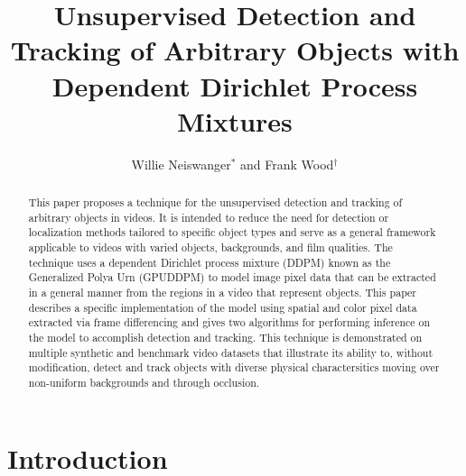 \documentclass[twocolumn, final]{svjour3}
\begin{document}

\title{Unsupervised Detection and Tracking of Arbitrary Objects with Dependent Dirichlet Process Mixtures}
\author{Willie Neiswanger$^{*}$ and Frank Wood$^{\dagger}$}
\date{}  %
\maketitle



\begin{abstract}
This paper proposes a technique for the unsupervised detection and tracking of arbitrary objects in videos. It is intended to reduce the need for detection or localization methods tailored to specific object types and serve as a general framework applicable to videos with varied objects, backgrounds, and film qualities. The technique uses a dependent Dirichlet process mixture (DDPM) known as the Generalized Polya Urn (GPUDDPM) to model image pixel data that can be extracted in a general manner from the regions in a video that represent objects. This paper describes a specific implementation of the model using spatial and color pixel data extracted via frame differencing and gives two algorithms for performing inference on the model to accomplish detection and tracking. This technique is demonstrated on multiple synthetic and benchmark video datasets that illustrate its ability to, without modification, detect and track objects with diverse physical charactersitics moving over non-uniform backgrounds and through occlusion.
\end{abstract}




\section{Introduction}
\label{sec:introduction}
\end{document}
